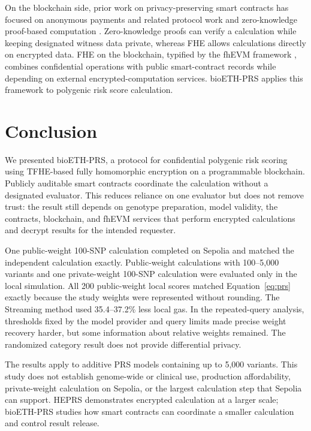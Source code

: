 \documentclass[10pt]{article}
\begin{document}
On the blockchain side, prior work on privacy-preserving smart contracts has
focused on anonymous payments and related protocol work
\citep{sasson2014zerocash,pertsev2019tornado} and
zero-knowledge proof-based computation \citep{ben2018starkware}.  Zero-knowledge proofs
can verify a calculation while keeping designated witness data private, whereas FHE
allows calculations directly on encrypted data.  FHE on the blockchain, typified by the fhEVM
framework \citep{zamafhevm}, combines confidential operations with public smart-contract
records while depending on external encrypted-computation services.  bioETH-PRS applies
this framework to polygenic risk score calculation.

\section{Conclusion}
\label{sec:conclusion}

We presented bioETH-PRS, a protocol for confidential polygenic risk
scoring using TFHE-based fully homomorphic encryption on a programmable blockchain.
Publicly auditable smart contracts coordinate the calculation without a designated
evaluator.  This reduces reliance on one evaluator but does not
remove trust: the result still depends on genotype preparation, model validity, the
contracts, blockchain, and fhEVM services that perform encrypted calculations and
decrypt results for the intended requester.

One public-weight 100-SNP calculation completed on Sepolia and matched the independent
calculation exactly.  Public-weight calculations with 100--5,000 variants and one
private-weight 100-SNP calculation were evaluated only in the local simulation.  All
200 public-weight local scores matched
Equation~\ref{eq:prs} exactly because the study weights were represented without
rounding.  The Streaming method used 35.4--37.2\% less local gas.  In the repeated-query
analysis, thresholds fixed by the model provider and query limits made precise weight
recovery harder,
but some information about relative weights remained.  The randomized category result
does not provide differential privacy.

The results apply to additive PRS models containing up to 5,000 variants.  This study
does not establish genome-wide or clinical use, production affordability,
private-weight calculation on Sepolia, or the largest calculation step that Sepolia can
support.  HEPRS demonstrates encrypted calculation at a larger scale; bioETH-PRS studies
how smart contracts can coordinate a smaller calculation and control result release.
\end{document}
